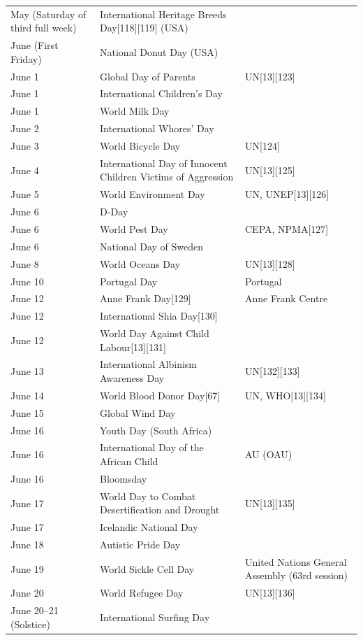 \documentclass[
  openany]{book}
\begin{document}
\begin{longtable}[t]{>{\raggedright\arraybackslash}p{8em}>{\raggedright\arraybackslash}p{20em}>{\raggedright\arraybackslash}p{12em}}
May (Saturday of third full week) & International Heritage Breeds Day[118][119] (USA) & \\
June (First Friday) & National Donut Day (USA) & \\
June 1 & Global Day of Parents & UN[13][123]\\
\addlinespace
June 1 & International Children's Day & \\
June 1 & World Milk Day & \\
June 2 & International Whores' Day & \\
June 3 & World Bicycle Day & UN[124]\\
June 4 & International Day of Innocent Children Victims of Aggression & UN[13][125]\\
\addlinespace
June 5 & World Environment Day & UN, UNEP[13][126]\\
June 6 & D-Day & \\
June 6 & World Pest Day & CEPA, NPMA[127]\\
June 6 & National Day of Sweden & \\
June 8 & World Oceans Day & UN[13][128]\\
\addlinespace
June 10 & Portugal Day & Portugal\\
June 12 & Anne Frank Day[129] & Anne Frank Centre\\
June 12 & International Shia Day[130] & \\
June 12 & World Day Against Child Labour[13][131] & \\
June 13 & International Albinism Awareness Day & UN[132][133]\\
\addlinespace
June 14 & World Blood Donor Day[67] & UN, WHO[13][134]\\
June 15 & Global Wind Day & \\
June 16 & Youth Day (South Africa) & \\
June 16 & International Day of the African Child & AU (OAU)\\
June 16 & Bloomsday & \\
\addlinespace
June 17 & World Day to Combat Desertification and Drought & UN[13][135]\\
June 17 & Icelandic National Day & \\
June 18 & Autistic Pride Day & \\
June 19 & World Sickle Cell Day & United Nations General Assembly (63rd session)\\
June 20 & World Refugee Day & UN[13][136]\\
\addlinespace
June 20–21 (Solstice) & International Surfing Day & \\

\end{longtable}
\end{document}
